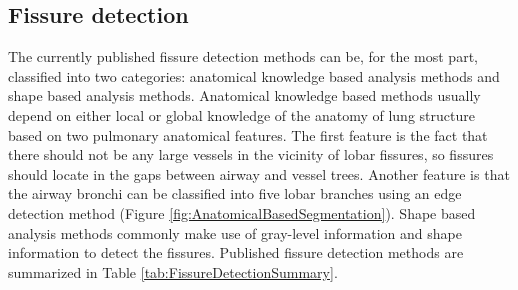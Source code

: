 \subsection{Fissure detection}
The currently published fissure detection methods can be, for the most part, classified into two categories: anatomical knowledge based analysis methods and shape based analysis methods. Anatomical knowledge based methods usually depend on either local or global knowledge of the anatomy of lung structure based on two pulmonary anatomical features. The first feature is the fact that there should not be any large vessels in the vicinity of lobar fissures, so fissures should locate in the gaps between airway and vessel trees. Another feature is that the airway bronchi can be classified into five lobar branches using an edge detection method (Figure \ref{fig:AnatomicalBasedSegmentation}). Shape based analysis methods commonly make use of gray-level information and shape information to detect the fissures. Published fissure detection methods are summarized in Table \ref{tab:FissureDetectionSummary}.

